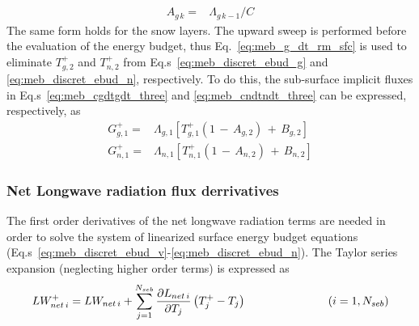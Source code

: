 {\begin{subequations}
\begin{align}
\\
A_{g\,k} = & \Lambda_{g\,k-1}/C
%
\end{align}
\end{subequations}
%
%
The same form holds for the snow layers.
The upward sweep is performed before the evaluation of the energy
budget, thus Eq.~\ref{eq:meb_g_dt_rm_sfc}
is used to eliminate $T_{g,2}^+$  and $T_{n,2}^+$ 
from Eq.s~\ref{eq:meb_discret_ebud_g} and \ref{eq:meb_discret_ebud_n},
respectively. To do this, the sub-surface implicit 
fluxes in Eq.s~\ref{eq:meb_cgdtgdt_three} and \ref{eq:meb_cndtndt_three}
can be expressed, respectively, as
%
\begin{subequations}\label{eq:meb_gflux_subsfc}
\begin{align}
\label{eq:meb_gflux_ground_subsfc}
G_{g,1}^+ = & \Lambda_{g,1}\left[ T_{g,1}^+\left(1 \,-\, A_{g,2}\right) \,+\, B_{g,2} \right]
\\
\label{eq:meb_gflux_snow_subsfc}
G_{n,1}^+ = & \Lambda_{n,1}\left[ T_{n,1}^+\left(1 \,-\, A_{n,2}\right) \,+\, B_{n,2} \right]
%
\end{align}
\end{subequations}
%


\subsubsection{Net Longwave radiation flux derrivatives}
\label{sec:meb_lw_derrivatives}

The first order derivatives of the net longwave radiation terms are needed
in order to solve the system of linearized surface energy budget
equations (Eq.s~\ref{eq:meb_discret_ebud_v}-\ref{eq:meb_discret_ebud_n}).
The Taylor series expansion (neglecting higher order terms) is expressed as
%
\begin{equation}
\label{eq:meb_LWnet_Taylor}
%
LW_{net\,i}^+ = LW_{net\,i} + \sum_{j=1}^{N_{seb}} 
{\frac{\partial L_{net\,i}}{\partial T_{j}}}
\left( T_{j}^+ - T_j \right)
\hskip1.in
\left( i=1,N_{seb}\right)
%
\end{equation}

}
